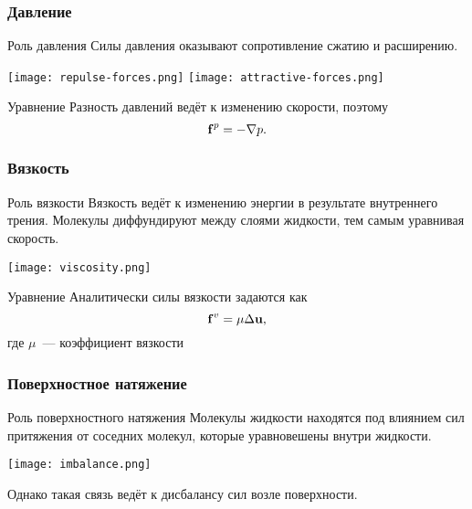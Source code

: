 \begin{frame}
  \frametitle{Давление}

  \begin{block}{Роль давления}
    Силы давления оказывают сопротивление сжатию и расширению.
    \begin{center}
      \texttt{[image: repulse-forces.png]}
      \hspace{1.5cm}
      \texttt{[image: attractive-forces.png]}
    \end{center}
  \end{block}

  \begin{block}{Уравнение}
    Разность давлений ведёт к изменению скорости, поэтому
    \[ \boldsymbol{\mathbf{f}}^p=-\nabla p. \]
  \end{block}
\end{frame}

\begin{frame}
  \frametitle{Вязкость}

  \begin{block}{Роль вязкости}
    Вязкость ведёт к изменению энергии в результате внутреннего трения. Молекулы диффундируют между слоями жидкости, тем самым уравнивая скорость.
    \begin{center}
      \texttt{[image: viscosity.png]}
    \end{center}
  \end{block}

  \begin{block}{Уравнение}
    Аналитически силы вязкости задаются как
    \[ \boldsymbol{\mathbf{f}}^v=\mu\Delta\boldsymbol{\mathbf{u}}, \]
    где $\mu$~--- коэффициент вязкости
  \end{block}
\end{frame}

\begin{frame}
  \frametitle{Поверхностное натяжение}

  \begin{block}{Роль поверхностного натяжения}
    Молекулы жидкости находятся под влиянием сил притяжения от соседних молекул, которые уравновешены внутри жидкости.
    \begin{center}
      \texttt{[image: imbalance.png]}
    \end{center}
    Однако такая связь ведёт к дисбалансу сил возле поверхности.
  \end{block}
\end{frame}


